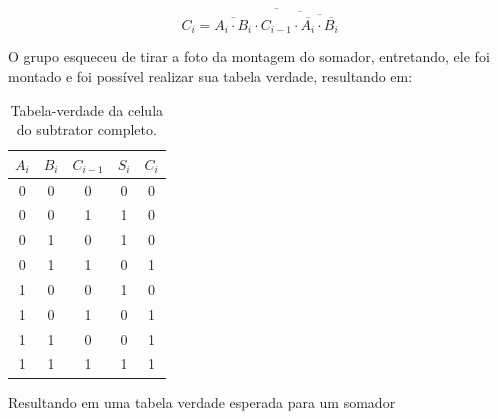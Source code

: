 \begin{equation}
    C_i = \overline{
        \overline{A_i \cdot B_i} \cdot
        \overline{C_{i-1} \cdot \overline{\overline{A_i} \cdot \overline{B_i}}}
    }
\end{equation}

O grupo esqueceu de tirar a foto da montagem do somador, entretando, ele foi montado e foi possível realizar sua tabela verdade, resultando em:

\begin{table}[!ht]
    \centering
    \caption{Tabela-verdade da celula do subtrator completo.}
    \begin{tabular}{ccccc}
        \toprule
        $A_i$ & $B_i$ & $C_{i-1}$ & $S_i$ & $C_i$ \\
        \midrule
        0     & 0     & 0         & 0     & 0     \\
        0     & 0     & 1         & 1     & 0     \\
        0     & 1     & 0         & 1     & 0     \\
        0     & 1     & 1         & 0     & 1     \\
        1     & 0     & 0         & 1     & 0     \\
        1     & 0     & 1         & 0     & 1     \\
        1     & 1     & 0         & 0     & 1     \\
        1     & 1     & 1         & 1     & 1     \\
        \bottomrule
    \end{tabular}
    \label{tab:Somador}
\end{table}

Resultando em uma tabela verdade esperada para um somador

